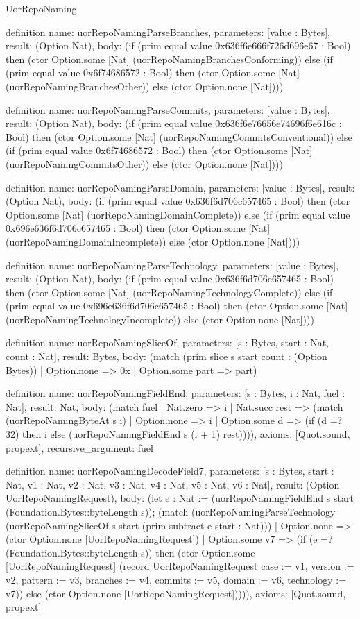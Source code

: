 \begin{lexlean}{UorRepoNaming}
\begin{semanticmodule}
definition{
  name: uorRepoNamingParseBranches,
  parameters: [value : Bytes],
  result: (Option Nat),
  body: (if (prim equal value 0x636f6e666f726d696e67 : Bool) then (ctor Option.some [Nat] (uorRepoNamingBranchesConforming)) else (if (prim equal value 0x6f74686572 : Bool) then (ctor Option.some [Nat] (uorRepoNamingBranchesOther)) else (ctor Option.none [Nat])))
}

definition{
  name: uorRepoNamingParseCommits,
  parameters: [value : Bytes],
  result: (Option Nat),
  body: (if (prim equal value 0x636f6e76656e74696f6e616c : Bool) then (ctor Option.some [Nat] (uorRepoNamingCommitsConventional)) else (if (prim equal value 0x6f74686572 : Bool) then (ctor Option.some [Nat] (uorRepoNamingCommitsOther)) else (ctor Option.none [Nat])))
}

definition{
  name: uorRepoNamingParseDomain,
  parameters: [value : Bytes],
  result: (Option Nat),
  body: (if (prim equal value 0x636f6d706c657465 : Bool) then (ctor Option.some [Nat] (uorRepoNamingDomainComplete)) else (if (prim equal value 0x696e636f6d706c657465 : Bool) then (ctor Option.some [Nat] (uorRepoNamingDomainIncomplete)) else (ctor Option.none [Nat])))
}

definition{
  name: uorRepoNamingParseTechnology,
  parameters: [value : Bytes],
  result: (Option Nat),
  body: (if (prim equal value 0x636f6d706c657465 : Bool) then (ctor Option.some [Nat] (uorRepoNamingTechnologyComplete)) else (if (prim equal value 0x696e636f6d706c657465 : Bool) then (ctor Option.some [Nat] (uorRepoNamingTechnologyIncomplete)) else (ctor Option.none [Nat])))
}

definition{
  name: uorRepoNamingSliceOf,
  parameters: [s : Bytes, start : Nat, count : Nat],
  result: Bytes,
  body: (match (prim slice s start count : (Option Bytes))
    | Option.none => 0x
    | Option.some part => part)
}

definition{
  name: uorRepoNamingFieldEnd,
  parameters: [s : Bytes, i : Nat, fuel : Nat],
  result: Nat,
  body: (match fuel
    | Nat.zero => i
    | Nat.succ rest => (match (uorRepoNamingByteAt s i)
      | Option.none => i
      | Option.some d => (if (d =? 32) then i else (uorRepoNamingFieldEnd s (i + 1) rest)))),
  axioms: [Quot.sound, propext],
  recursive_argument: fuel
}

definition{
  name: uorRepoNamingDecodeField7,
  parameters: [s : Bytes, start : Nat, v1 : Nat, v2 : Nat, v3 : Nat, v4 : Nat, v5 : Nat, v6 : Nat],
  result: (Option UorRepoNamingRequest),
  body: (let e : Nat := (uorRepoNamingFieldEnd s start (Foundation.Bytes::byteLength s)); (match (uorRepoNamingParseTechnology (uorRepoNamingSliceOf s start (prim subtract e start : Nat)))
    | Option.none => (ctor Option.none [UorRepoNamingRequest])
    | Option.some v7 => (if (e =? (Foundation.Bytes::byteLength s)) then (ctor Option.some [UorRepoNamingRequest] (record UorRepoNamingRequest {case := v1, version := v2, pattern := v3, branches := v4, commits := v5, domain := v6, technology := v7})) else (ctor Option.none [UorRepoNamingRequest])))),
  axioms: [Quot.sound, propext]
}


\end{semanticmodule}
\end{lexlean}
